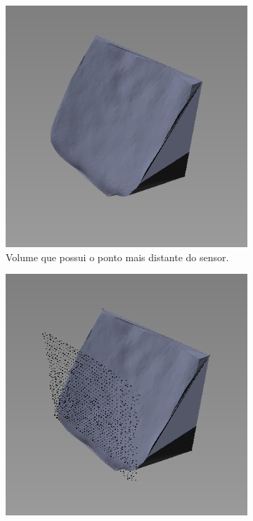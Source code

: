 \begin{figure}[H]
    \centering
    \caption{Reconstrução do volume de dois modelos em comparação.}
    \begin{subfigure}[t]{0.325\textwidth}
        \includegraphics[width=\textwidth]{dados/figuras/projection1.png}
        \caption{Volume que possui o ponto mais distante do sensor.}
        \label{fig:projection1}
    \end{subfigure}
    \begin{subfigure}[t]{0.325\textwidth}
        \includegraphics[width=\textwidth]{dados/figuras/projection2.png}

\end{subfigure}
\end{figure}

